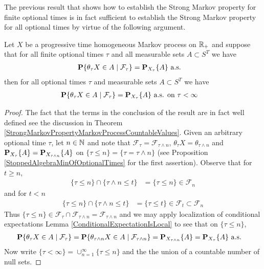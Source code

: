 The previous result that shows how to establish the Strong Markov property for finite optional times is in fact sufficient to establish the Strong Markov property for all optional times by virtue of the following argument.
\begin{prop}\label{StrongMarkovFromStrongMarkovFiniteOptional}Let $X$ be a progressive time homogeneous Markov process on
  $\reals_+$ and suppose that for all finite optional
  times $\tau$ and all measurable sets
  $A \subset S^T$ we have
\begin{align*}
\cprobability{\mathcal{F}_\tau}{\theta_\tau X \in A} &= \sprobability{A}{X_\tau} \text{ a.s.}
\end{align*}
then for all optional times $\tau$ and measurable sets
  $A \subset S^T$ we have
\begin{align*}
\cprobability{\mathcal{F}_\tau}{\theta_\tau X \in A} &= \sprobability{A}{X_\tau} \text{ a.s. on $\tau < \infty$}
\end{align*}
\end{prop}
\begin{proof}
The fact that the terms in the conclusion of the result are in fact well defined see the discussion in Theorem \ref{StrongMarkovPropertyMarkovProcessCountableValues}.  Given an arbitrary optional time $\tau$, let $n \in \naturals$ and note that $\mathcal{F}_\tau = \mathcal{F}_{\tau \wedge n}$, $\theta_\tau X = \theta_{\tau \wedge n}$ and $\sprobability{A}{X_\tau}=\sprobability{A}{X_{\tau \wedge n}}$ on $\lbrace \tau \leq n \rbrace = \lbrace \tau = \tau \wedge n \rbrace$ (see Proposition \ref{StoppedAlgebraMinOfOptionalTimes} for the first assertion).  Observe that for $t \geq n$, 
\begin{align*}
\lbrace \tau \leq n \rbrace \cap \lbrace \tau \wedge n \leq t \rbrace &= \lbrace \tau \leq n \rbrace \in \mathcal{F}_n
\end{align*} 
and for $t < n$
\begin{align*}
\lbrace \tau \leq n \rbrace \cap \lbrace \tau \wedge n \leq t \rbrace &= \lbrace \tau \leq t \rbrace \in \mathcal{F}_t \subset \mathcal{F}_n
\end{align*} 
Thus $\lbrace \tau \leq n \rbrace  \in \mathcal{F}_\tau \cap \mathcal{F}_{\tau \wedge n} = \mathcal{F}_{\tau \wedge n}$ and we may apply  localization of conditional expectations Lemma \ref{ConditionalExpectationIsLocal} to see that on $\lbrace \tau \leq n \rbrace$,
\begin{align*}
\cprobability{\mathcal{F}_\tau}{\theta_\tau X \in A} &= \cprobability{\mathcal{F}_{\tau \wedge n}}{\theta_{\tau  \wedge n} X \in A} = \sprobability{A}{X_{\tau \wedge n}}  = \sprobability{A}{X_\tau}  \text{ a.s.}
\end{align*}
Now write $\lbrace \tau < \infty \rbrace = \cup_{n=1}^\infty \lbrace \tau \leq n \rbrace$ and the the union of a countable number of null sets.
\end{proof}

